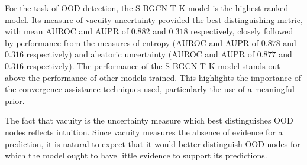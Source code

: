 \documentclass[
twocolumn,
]{ceurart}
\begin{document}

For the task of OOD detection, the S-BGCN-T-K model is the highest ranked model.
Its measure of vacuity uncertainty provided the best distinguishing metric, with mean AUROC and AUPR of $0.882$ and $0.318$ respectively, closely followed by performance from the measures of entropy (AUROC and AUPR of $0.878$ and $0.316$ respectively) and aleatoric uncertainty (AUROC and AUPR of $0.877$ and $0.316$ respectively).
The performance of the S-BGCN-T-K model stands out above the performance of other models trained.
This highlights the importance of the convergence assistance techniques used, particularly the use of a meaningful prior.

The fact that vacuity is the uncertainty measure which best distinguishes OOD nodes reflects intuition.
Since vacuity measures the absence of evidence for a prediction, it is natural to expect that it would better distinguish OOD nodes for which the model ought to have little evidence to support its predictions.
\end{document}
